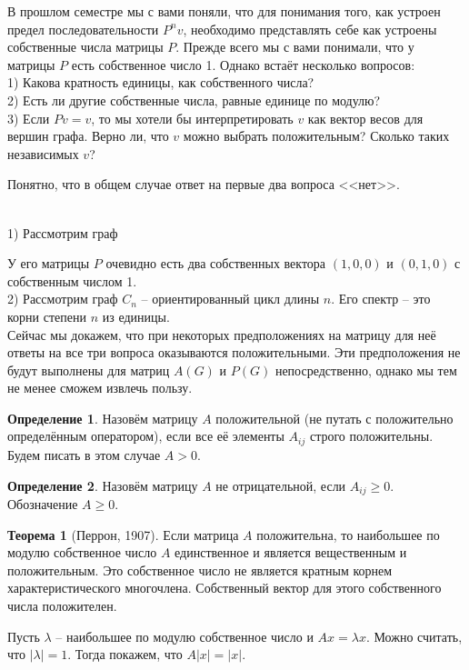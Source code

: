 \documentclass[10pt,a4paper,oneside]{book}
\theoremstyle{definition}
\newtheorem*{defn}{{\color{yellow!30!red} Определение}}
\newtheorem{thm}{{\color{red!40!black} Теорема}}
\def\exm{\noindent {\bf Примеры:}}
\def\thrm{\begin{thm}}
\def\ethrm{\end{thm}}
\def\dfn{\begin{defn}}
\def\edfn{\end{defn}}
\begin{document}
В прошлом семестре мы с вами поняли, что для понимания того, как устроен предел последовательности $P^nv$, необходимо представлять себе как устроены собственные числа матрицы $P$. Прежде всего мы с вами понимали, что у матрицы $P$ есть собственное число 1. Однако встаёт несколько вопросов:\\
1) Какова кратность единицы, как собственного числа?\\
2) Есть ли другие собственные числа, равные единице по модулю?\\
3) Если $Pv=v$, то мы хотели бы интерпретировать $v$ как вектор весов для вершин графа. Верно ли, что $v$ можно выбрать положительным? Сколько таких независимых $v$?

Понятно, что в общем случае ответ на первые два вопроса <<нет>>.

\exm \\
1) Рассмотрим граф 
\begin{center}
\end{center}
У его матрицы $P$ очевидно есть два собственных вектора $(1,0,0)$ и $(0,1,0)$ с собственным числом 1.\\
2) Рассмотрим граф $C_n$ -- ориентированный цикл длины $n$. Его спектр -- это корни степени $n$ из единицы.\\

Сейчас мы докажем, что при некоторых предположениях на матрицу для неё ответы на все три вопроса оказываются положительными. Эти предположения не будут выполнены для матриц $A(G)$ и  $P(G)$ непосредственно, однако мы тем не менее сможем извлечь пользу.

\dfn Назовём матрицу $A$ положительной (не путать с положительно определённым оператором), если все её элементы $A_{ij}$ строго положительны. Будем писать в этом случае $A>0$.
\edfn

\dfn Назовём матрицу  $A$ не отрицательной, если $A_{ij}\geq 0$. Обозначение $A \geq 0$.
\edfn

\thrm[Перрон, 1907] Если матрица $A$ положительна, то наибольшее по модулю собственное число $A$ единственное и является вещественным и положительным. Это собственное число не является кратным корнем характеристического многочлена. Собственный вектор для этого собственного числа положителен.
\ethrm
\proof Пусть $\lambda$ -- наибольшее по модулю собственное число и $Ax=\lambda x$. Можно считать, что $|\lambda|=1$. Тогда покажем, что $A|x|=|x|$.
\end{document}
